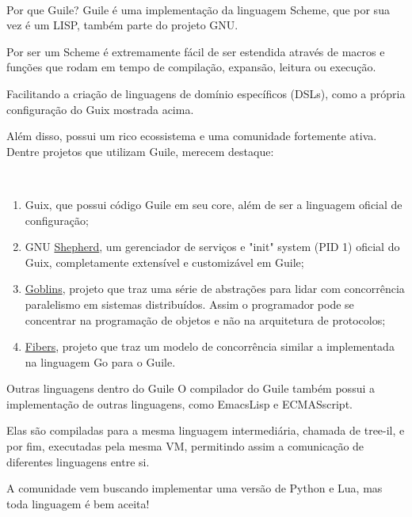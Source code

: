 \documentclass[bigger]{beamer}
\begin{document}
\begin{frame}[label={sec:orgdd80345}]{⁤}
\begin{minipage}[c]{0.5\textwidth}
\end{minipage}
\end{frame}
\begin{frame}[label={sec:org1f1abb9}]{Por que Guile?}
Guile é uma implementação da linguagem Scheme, que por sua vez é um LISP, também parte do projeto GNU.

Por ser um Scheme é extremamente fácil de ser estendida através de macros e funções que rodam em tempo de
compilação, expansão, leitura ou execução.

Facilitando a criação de linguagens de domínio específicos (DSLs), como a própria configuração do Guix mostrada
acima.

Além disso, possui um rico ecossistema e uma comunidade fortemente ativa. Dentre projetos que utilizam Guile,
merecem destaque:
\end{frame}
\begin{frame}[label={sec:org4d751fb}]{⁤}
\begin{enumerate}
\item Guix, que possui código Guile em seu core, além de ser a linguagem oficial de configuração;
\item GNU \href{https://www.gnu.org/software/shepherd/}{Shepherd}, um gerenciador de serviços e "init" system (PID 1) oficial do Guix, completamente extensível
e customizável em Guile;
\item \href{https://spritely.institute/goblins/}{Goblins}, projeto que traz uma série de abstrações para lidar com concorrência paralelismo em sistemas
distribuídos. Assim o programador pode se concentrar na programação de objetos e não na
arquitetura de protocolos;
\item \href{https://github.com/wingo/fibers}{Fibers}, projeto que traz um modelo de concorrência similar a implementada na linguagem Go para o Guile.
\end{enumerate}
\end{frame}
\begin{frame}[label={sec:orgb61b89a}]{Outras linguagens dentro do Guile}
O compilador do Guile também possui a implementação de outras linguagens, como EmacsLisp e ECMASscript.

Elas são compiladas para a mesma linguagem intermediária, chamada de tree-il, e por fim, executadas pela
mesma VM, permitindo assim a comunicação de diferentes linguagens entre si.

A comunidade vem buscando implementar uma versão de Python e Lua, mas toda linguagem é bem aceita!
\end{frame}
\end{document}
